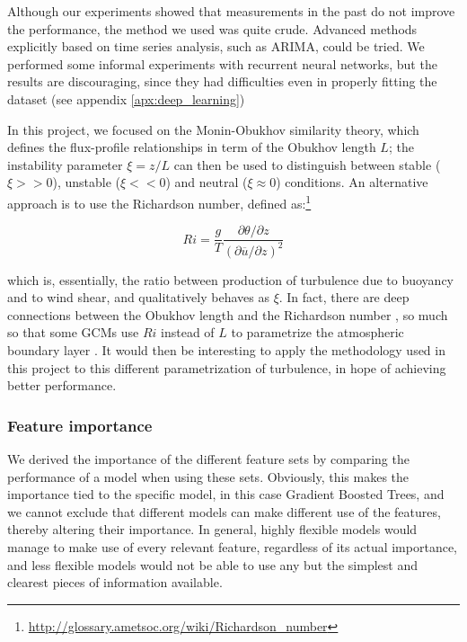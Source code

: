 \documentclass[a4paper,11pt]{kth-mag}
\begin{document}
Although our experiments showed that measurements in the past do not improve the performance, the method we used was quite crude. Advanced methods explicitly based on time series analysis, such as ARIMA, could be tried. We performed some informal experiments with recurrent neural networks, but the results are discouraging, since they had difficulties even in properly fitting the dataset (see appendix \ref{apx:deep_learning})

In this project, we focused on the Monin-Obukhov similarity theory, which defines the flux-profile relationships in term of the Obukhov length $L$; the instability parameter $\xi=z/L$ can then be used to distinguish between stable ($\xi>>0$), unstable ($\xi<<0$) and neutral ($\xi\approx0$) conditions. An alternative approach is to use the Richardson number, defined as:\footnote{\url{http://glossary.ametsoc.org/wiki/Richardson_number}}

\begin{equation}
Ri=\frac{g}{T}\frac{\partial\theta/\partial z}{(\partial\overline{u}/\partial z)^2}
\end{equation}

\noindent which is, essentially, the ratio between production of turbulence due to buoyancy and to wind shear, and qualitatively behaves as $\xi$. In fact, there are deep connections between the Obukhov length and the Richardson number \citep{mostayyyy}, so much so that some GCMs use $Ri$ instead of $L$ to parametrize the atmospheric boundary layer \citep{gfdl_am2,gfdl_am3}. It would then be interesting to apply the methodology used in this project to this different parametrization of turbulence, in hope of achieving better performance.

\subsubsection{Feature importance}
We derived the importance of the different feature sets by comparing the performance of a model when using these sets. Obviously, this makes the importance tied to the specific model, in this case Gradient Boosted Trees, and we cannot exclude that different models can make different use of the features, thereby altering their importance. In general, highly flexible models would manage to make use of every relevant feature, regardless of its actual importance, and less flexible models would not be able to use any but the simplest and clearest pieces of information available.
\end{document}

